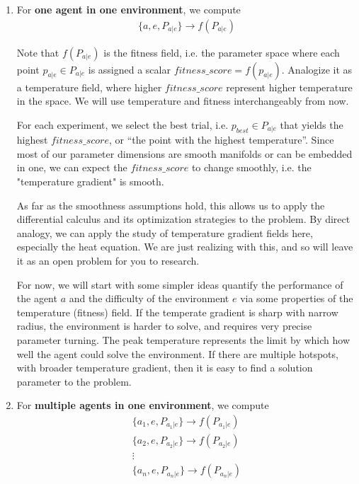 \documentclass[12pt]{article}
\begin{document}
\begin{enumerate}
  \item For \textbf{one agent in one environment}, we compute
  \begin{align*}
  \{a, e, P_{a|e}\} \longrightarrow f(P_{a|e})
  \end{align*}

  Note that $f(P_{a|e})$ is the fitness field, i.e. the parameter space where each point $p_{a|e} \in P_{a|e}$ is assigned a scalar $fitness\_score = f(p_{a|e})$. Analogize it as a temperature field, where higher $fitness\_score$ represent higher temperature in the space. We will use temperature and fitness interchangeably from now.

  For each experiment, we select the best trial, i.e. $p_{best} \in P_{a|e}$ that yields the highest $fitness\_score$, or ``the point with the highest temperature''. Since most of our parameter dimensions are smooth manifolds or can be embedded in one, we can expect the $fitness\_score$ to change smoothly, i.e. the "temperature gradient" is smooth.

  As far as the smoothness assumptions hold, this allows us to apply the differential calculus and its optimization strategies to the problem. By direct analogy, we can apply the study of temperature gradient fields here, especially the heat equation. We are just realizing with this, and so will leave it as an open problem for you to research.

  For now, we will start with some simpler ideas quantify the performance of the agent $a$ and the difficulty of the environment $e$ via some properties of the temperature (fitness) field. If the temperate gradient is sharp with narrow radius, the environment is harder to solve, and requires very precise parameter turning. The peak temperature represents the limit by which how well the agent could solve the environment. If there are multiple hotspots, with broader temperature gradient, then it is easy to find a solution parameter to the problem.

  
  \item For \textbf{multiple agents in one environment}, we compute
  \begin{align*}
  \{a_1, e, P_{a_1|e}\} \longrightarrow f(P_{a_1|e}) \\
  \{a_2, e, P_{a_2|e}\} \longrightarrow f(P_{a_2|e}) \\
  \vdots \\
  \{a_n, e, P_{a_n|e}\} \longrightarrow f(P_{a_n|e}) \\
  \end{align*}


\end{enumerate}
\end{document}
